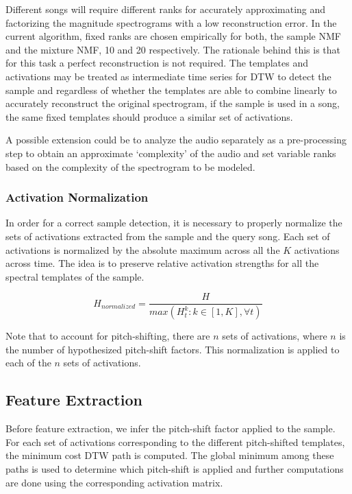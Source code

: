 \documentclass{article}
\begin{document}
Different songs will require different ranks for accurately approximating and factorizing the magnitude spectrograms with a low reconstruction error. In the current algorithm, fixed ranks are chosen empirically for both, the sample NMF and the mixture NMF, 10 and 20 respectively. The rationale behind this is that for this task a perfect reconstruction is not required. The templates and activations may be treated as intermediate time series for DTW to detect the sample and regardless of whether the templates are able to combine linearly to accurately reconstruct the original spectrogram, if the sample is used in a song, the same fixed templates should produce a similar set of activations. 

A possible extension could be to analyze the audio separately as a pre-processing step to obtain an approximate `complexity' of the audio and set variable ranks based on the complexity of the spectrogram to be modeled. 

\subsubsection{Activation Normalization}

In order for a correct sample detection, it is necessary to properly normalize the sets of activations extracted from the sample and the query song. Each set of activations is normalized by the absolute maximum across all the $K$ activations across time. The idea is to preserve relative activation strengths for all the spectral templates of the sample.

\[H_{normalized} = \frac{H}{max(H^{k}_{t}: k\in[1,K], \forall t )}\]

Note that to account for pitch-shifting, there are $n$ sets of activations, where $n$ is the number of hypothesized pitch-shift factors. This normalization is applied to each of the $n$ sets of activations. 


\subsection{Feature Extraction}

Before feature extraction, we infer the pitch-shift factor applied to the sample. For each set of activations corresponding to the different pitch-shifted templates, the minimum cost DTW path is computed. The global minimum among these paths is used to determine which pitch-shift is applied and further computations are done using the corresponding activation matrix.
\end{document}

